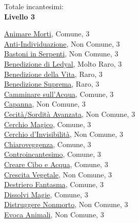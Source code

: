 \begin{multicols}{3}
{{\medskip Totale incantesimi: \theinclvdue\\

\textbf{Livello 3}  

\hyperlink{Animare Morti}{Animare Morti}, Comune, 3\\
\hyperlink{Anti-Individuazione}{Anti-Individuazione}, Non Comune, 3\\
\hyperlink{Bastoni in Serpenti}{Bastoni in Serpenti}, Non Comune, 3\\
\hyperlink{Benedizione di Ledyal}{Benedizione di Ledyal}, Molto Raro, 3\\
\hyperlink{Benedizione della Vita}{Benedizione della Vita}, Raro, 3\\
\hyperlink{Benedizione Suprema}{Benedizione Suprema}, Raro, 3\\
\hyperlink{Camminare sull'Acqua}{Camminare sull'Acqua}, Comune, 3\\
\hyperlink{Capanna}{Capanna}, Non Comune, 3\\
\hyperlink{Cecità/Sordità Avanzata}{Cecità/Sordità Avanzata}, Non Comune, 3\\
\hyperlink{Cerchio Magico}{Cerchio Magico}, Comune, 3\\
\hyperlink{Cerchio d'Invisibilità}{Cerchio d'Invisibilità}, Non Comune, 3\\
\hyperlink{Chiaroveggenza}{Chiaroveggenza}, Comune, 3\\
\hyperlink{Controincantesimo}{Controincantesimo}, Comune, 3\\
\hyperlink{Creare Cibo e Acqua}{Creare Cibo e Acqua}, Comune, 3\\
\hyperlink{Crescita Vegetale}{Crescita Vegetale}, Non Comune, 3\\
\hyperlink{Destriero Fantasma}{Destriero Fantasma}, Comune, 3\\
\hyperlink{Dissolvi Magie}{Dissolvi Magie}, Comune, 3\\
\hyperlink{Distruggere nonmorto}{Distruggere Nonmorto}, Non Comune, 3\\
\hyperlink{Evoca Animali}{Evoca Animali}, Non Comune, 3\\
}}
\end{multicols}
